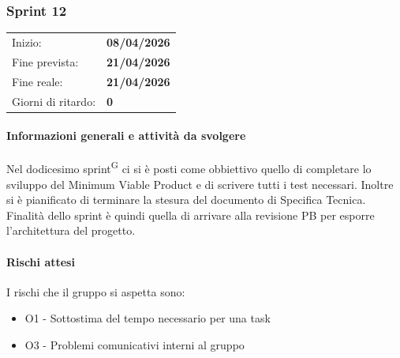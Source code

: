 \documentclass[a4paper, 11pt]{article}
\newcommand{\subsubsubsection}[1]{\paragraph{#1}}
\begin{document}
\newpage

\subsubsection{Sprint 12}
\begin{tabular}{ll}
	Inizio: & \textbf{08/04/2026} \\
	Fine prevista: & \textbf{21/04/2026} \\
	Fine reale: & \textbf{21/04/2026} \\
	Giorni di ritardo: & \textbf{0} \\
\end{tabular}


\subsubsubsection{Informazioni generali e attività da svolgere}
Nel dodicesimo sprint\textsuperscript{G} ci si è posti come obbiettivo quello di completare lo sviluppo del Minimum Viable Product e di scrivere tutti i test necessari. Inoltre si è pianificato di terminare la stesura del documento di Specifica Tecnica. Finalità dello sprint è quindi quella di arrivare alla revisione PB per esporre l'architettura del progetto.\\

\subsubsubsection{Rischi attesi}
I rischi che il gruppo si aspetta sono:
\begin{itemize}
  \item O1 - Sottostima del tempo necessario per una task
	\item O3 - Problemi comunicativi interni al gruppo
\end{itemize}
\end{document}
